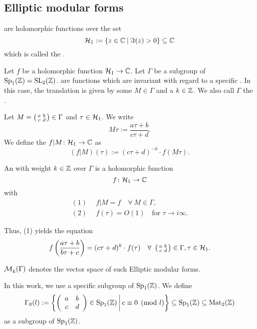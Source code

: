 

\subsection{Elliptic modular forms}
 are holomorphic functions over the set
\[ \SiegelHalfPlane_1 := \Set{z \in \C}{\Im(z) > 0} \subseteq \C \]
which is called the .

Let $f$ be a holomorphic function $\mathcal{H}_1 \rightarrow \mathbb{C}$. Let $\Gamma$ be a subgroup of $\operatorname{Sp}_1(\mathbb{Z}) = \operatorname{SL}_2(\mathbb{Z})$.  are functions which are invariant with regard to a specific . In this case, the translation is given by some $M \in \Gamma$ and a  $k \in \mathbb{Z}$. We also call $\Gamma$ the .

Let $M = \left( \begin{smallmatrix} a & b \\ c & d \end{smallmatrix} \right) \in \Gamma$ and $\tau \in \mathcal{H}_1$. We write
\[ M \tau := \frac{a \tau + b}{c \tau + d} . \]
We define the  $f | M \colon \mathcal{H}_1 \rightarrow \mathbb{C}$ as
\[ (f | M) (\tau) :=  (c \tau + d)^{-k} \cdot f(M \tau) . \]

An  with weight $k \in \mathbb{Z}$ over $\Gamma$ is a holomorphic function
\[ f \colon \mathcal{H}_1 \rightarrow \mathbb{C} \]
with
\begin{align*}
(1) \ \ & f | M  = f \quad \forall \ M \in \Gamma, \\
(2) \ \ & f(\tau) = O(1) \quad \text{for } \tau \rightarrow i \infty .
\end{align*}

Thus, (1) yields the equation
\[ f\left(\frac{a \tau + b}{b \tau + c}\right) = (c \tau + d)^k \cdot f(\tau) \quad \forall \ \left( \begin{smallmatrix} a & b \\ c & d \end{smallmatrix} \right) \in \Gamma, \tau \in \mathcal{H}_1 . \]

$\operatorname{\mathcal{M}}^{}_k (\Gamma)$ denotes the vector space of such Elliptic modular forms.

In this work, we use a specific subgroup of $\operatorname{Sp}_1(\mathbb{Z})$. We define
\[ \Gamma_0(l) := \Set{\SimpleMatrix{a}{b}{c}{d} \in \Sp_1(\Z)}{c \equiv 0 \pmod{l}} \subseteq \Sp_1(\Z) \subseteq \M_2(\Z) \]
as a subgroup of $\operatorname{Sp}_1(\mathbb{Z})$.

